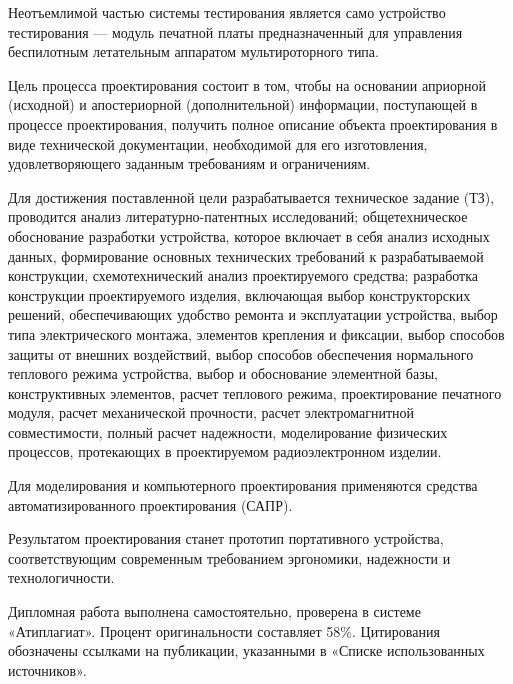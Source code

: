 Неотъемлимой частью системы тестирования является само устройство
тестирования — модуль печатной платы предназначенный для
управления беспилотным летательным аппаратом мультироторного типа.

Цель процесса проектирования состоит в том, чтобы на основании
априорной (исходной) и апостериорной (дополнительной) информации,
поступающей в процессе проектирования, получить полное описание
объекта проектирования в виде технической документации, необходимой
для его изготовления, удовлетворяющего заданным требованиям и
ограничениям.

Для достижения поставленной цели разрабатывается техническое задание
(ТЗ), проводится анализ литературно-патентных исследований;
общетехническое обоснование разработки устройства, которое включает в
себя анализ исходных данных, формирование основных технических
требований к разрабатываемой конструкции, схемотехнический анализ
проектируемого средства; разработка конструкции проектируемого
изделия, включающая выбор конструкторских решений, обеспечивающих
удобство ремонта и эксплуатации устройства, выбор типа электрического
монтажа, элементов крепления и фиксации, выбор способов защиты от
внешних воздействий, выбор способов обеспечения нормального теплового
режима устройства, выбор и обоснование элементной базы, конструктивных
элементов, расчет теплового режима, проектирование печатного модуля,
расчет механической прочности, расчет электромагнитной совместимости,
полный расчет надежности, моделирование физических процессов,
протекающих в проектируемом радиоэлектронном изделии.

Для моделирования и компьютерного проектирования применяются средства
автоматизированного проектирования (САПР).

Результатом проектирования станет прототип портативного устройства,
соответствующим современным требованием эргономики, надежности и
технологичности.

Дипломная работа выполнена самостоятельно, проверена в системе
«Атиплагиат».  Процент оригинальности составляет 58\%. Цитирования
обозначены ссылками на публикации, указанными в «Списке использованных
источников».

\newpage
